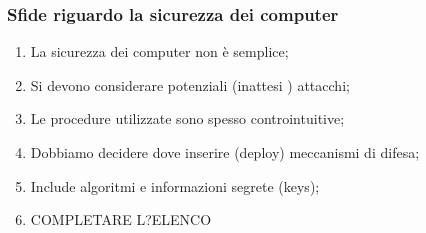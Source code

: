 \documentclass[12pt]{article}
\begin{document}
		\subsubsection{Sfide riguardo la sicurezza dei computer}
			\begin{enumerate}
				\item La sicurezza dei computer non è semplice;
				\item Si devono considerare potenziali (inattesi ) attacchi;
				\item Le procedure utilizzate sono spesso controintuitive;
				\item Dobbiamo decidere dove inserire (deploy) meccanismi di difesa;
				\item Include algoritmi e informazioni segrete (keys);
				\item COMPLETARE L?ELENCO  
			\end{enumerate}
			
\end{document}
